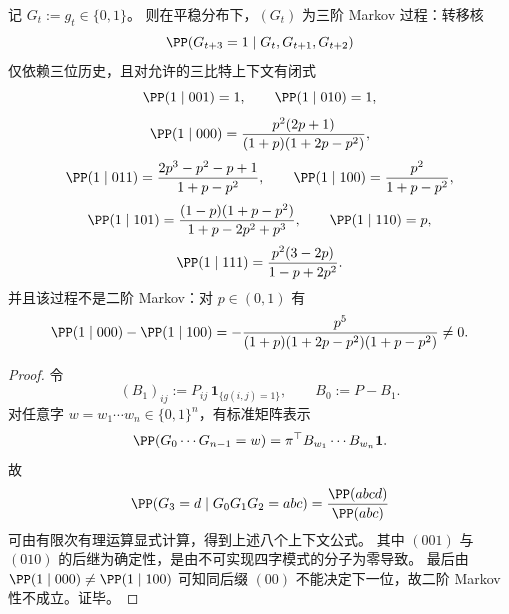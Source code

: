 \begin{theorem}\label{thm:fold-bernoulli-p-mismatch-strict-third-order-markov}
记 \(G_t:=g_t\in\{0,1\}\)。
则在平稳分布下，\((G_t)\) 为三阶 Markov 过程：转移核
\[
\PP(G_{t+3}=1\mid G_t,G_{t+1},G_{t+2})
\]
仅依赖三位历史，且对允许的三比特上下文有闭式
\[
\PP(1\mid 001)=1,\qquad \PP(1\mid 010)=1,
\]
\[
\PP(1\mid 000)=\frac{p^{2}(2p+1)}{(1+p)(1+2p-p^{2})},
\]
\[
\PP(1\mid 011)=\frac{2p^{3}-p^{2}-p+1}{1+p-p^{2}},
\qquad
\PP(1\mid 100)=\frac{p^{2}}{1+p-p^{2}},
\]
\[
\PP(1\mid 101)=\frac{(1-p)(1+p-p^{2})}{1+p-2p^{2}+p^{3}},
\qquad
\PP(1\mid 110)=p,
\]
\[
\PP(1\mid 111)=\frac{p^{2}(3-2p)}{1-p+2p^{2}}.
\]
并且该过程不是二阶 Markov：对 \(p\in(0,1)\) 有
\[
\PP(1\mid 000)-\PP(1\mid 100)
=-\frac{p^5}{(1+p)(1+2p-p^2)(1+p-p^2)}\neq 0.
\]
\end{theorem}
\begin{proof}
令
\[
(B_1)_{ij}:=P_{ij}\,\mathbf 1_{\{g(i,j)=1\}},\qquad B_0:=P-B_1.
\]
对任意字 \(w=w_1\cdots w_n\in\{0,1\}^n\)，有标准矩阵表示
\[
\PP(G_0\cdots G_{n-1}=w)
=\pi^\top B_{w_1}\cdots B_{w_n}\mathbf 1.
\]
故
\[
\PP(G_3=d\mid G_0G_1G_2=abc)
=\frac{\PP(abcd)}{\PP(abc)}
\]
可由有限次有理运算显式计算，得到上述八个上下文公式。
其中 \((001)\) 与 \((010)\) 的后继为确定性，是由不可实现四字模式的分子为零导致。
最后由
\(
\PP(1\mid 000)\neq \PP(1\mid 100)
\)
可知同后缀 \((00)\) 不能决定下一位，故二阶 Markov 性不成立。证毕。
\end{proof}

